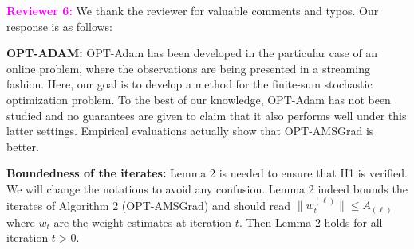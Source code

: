 \documentclass{article}
\begin{document}
\vspace{0.02in}

\textbf{\textcolor{magenta}{Reviewer 6:}} We thank the reviewer for valuable comments and typos. Our response is as follows:\vspace{-5pt}

\textbf{OPT-ADAM:} OPT-Adam has been developed in the particular case of an online problem, where the observations are being presented in a streaming fashion. Here, our goal is to develop a method for the finite-sum stochastic optimization problem. To the best of our knowledge, OPT-Adam has not been studied and no guarantees are given to claim that it also performs well under this latter settings. Empirical evaluations actually show that OPT-AMSGrad is better.

\textbf{Boundedness of the iterates:}  Lemma 2 is needed to ensure that H1 is verified. We will change the notations to avoid any confusion. Lemma 2 indeed bounds the iterates of Algorithm 2 (OPT-AMSGrad) and should read $\|w_t^{(\ell)} \| \leq A_{(\ell)}$ where $w_t$ are the weight estimates at iteration $t$. Then Lemma 2 holds for all iteration $t>0$.
\end{document}
